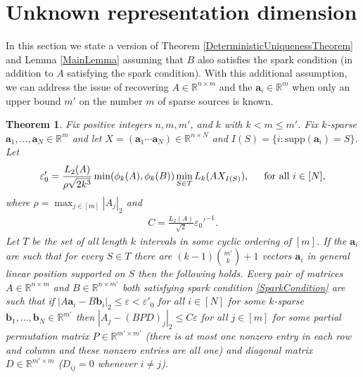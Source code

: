 \documentclass[journal, onecolumn]{IEEEtran}
\newtheorem{theorem}{Theorem}
\begin{document}
\section{Unknown representation dimension}\label{mleqm}

In this section we state a version of Theorem \ref{DeterministicUniquenessTheorem} and Lemma \ref{MainLemma} assuming that $B$ also satisfies the spark condition (in addition to $A$ satisfying the spark condition). With this additional assumption, we can address the issue of recovering $A \in \mathbb{R}^{n \times m}$ and the $\mathbf{a}_i \in \mathbb{R}^m$ when only an upper bound $m'$ on the number $m$ of sparse sources is known. 
\begin{theorem}\label{DeterministicUniquenessTheorem2}
Fix positive integers $n, m, m'$, and $k$ with $k < m \leq m'$. Fix $k$-sparse $\mathbf{a}_1, \ldots, \mathbf{a}_N \in \mathbb{R}^m$ and let $X  = (\mathbf{a}_1 \cdots \mathbf{a}_N) \in \mathbb{R}^{n \times N}$ and $I(S) = \{i : \text{supp}(\mathbf{a}_i) = S\}$. Let
\begin{align}\label{epsilon0'}
\varepsilon'_0 = \frac{ L_{2}(A)}{\rho \sqrt{2k^3} } \min(\phi_k(A), \phi_k(B)) \min_{S \in T} L_k(AX_{I(S)}),\indent \text{for all } i \in [N],
\end{align}
%
where $\rho = \max_{j \in [m]} |A_j|_2$ and
\begin{align}\label{C'}
C = \frac{L_{2}(A)}{ \sqrt{2}} \varepsilon_0'^{-1}.
\end{align}
Let $T$ be the set of all length $k$ intervals in some cyclic ordering of $[m]$. If the $\mathbf{a}_i$ are such that for every $S \in T$ there are $(k-1){m' \choose k}+1$ vectors $\mathbf{a}_i$ in general linear position supported on $S$ then the following holds. Every pair of matrices $A \in \mathbb{R}^{n \times m}$ and $B \in \mathbb{R}^{n \times m'}$ both satisfying spark condition \eqref{SparkCondition} are such that if $|A\mathbf{a}_i - B\mathbf{b}_i|_2 \leq \varepsilon < \varepsilon'_0$ for all $i \in [N]$ for some $k$-sparse $\mathbf{b}_1, \ldots, \mathbf{b}_N \in \mathbb{R}^{m'}$ then $|A_j-(BPD)_j|_2 \leq C\varepsilon$ for all $j \in [m]$ for some partial permutation matrix $P \in \mathbb{R}^{m' \times m'}$ (there is at most one nonzero entry in each row and column and these nonzero entries are all one) and diagonal matrix $D \in \mathbb{R}^{m' \times m}$ ($D_{ij} = 0$ whenever $i \neq j$).
\end{theorem}
\end{document}
